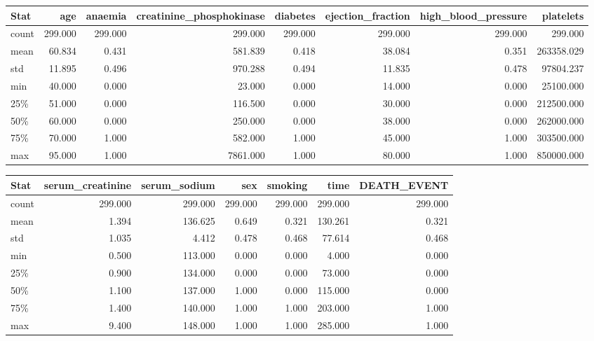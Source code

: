 \begin{table}[H]
\centering
\begin{adjustbox}{width=\textwidth}
\begin{tabular}{|l|rrrrrrr|}
\hline
\textbf{Stat} & \textbf{age} & \textbf{anaemia} & \textbf{creatinine\_phosphokinase} & \textbf{diabetes} & \textbf{ejection\_fraction} & \textbf{high\_blood\_pressure} & \textbf{platelets} \\
\hline
count & 299.000 & 299.000 & 299.000 & 299.000 & 299.000 & 299.000 & 299.000 \\
mean & 60.834 & 0.431 & 581.839 & 0.418 & 38.084 & 0.351 & 263358.029 \\
std & 11.895 & 0.496 & 970.288 & 0.494 & 11.835 & 0.478 & 97804.237 \\
min & 40.000 & 0.000 & 23.000 & 0.000 & 14.000 & 0.000 & 25100.000 \\
25\% & 51.000 & 0.000 & 116.500 & 0.000 & 30.000 & 0.000 & 212500.000 \\
50\% & 60.000 & 0.000 & 250.000 & 0.000 & 38.000 & 0.000 & 262000.000 \\
75\% & 70.000 & 1.000 & 582.000 & 1.000 & 45.000 & 1.000 & 303500.000 \\
max & 95.000 & 1.000 & 7861.000 & 1.000 & 80.000 & 1.000 & 850000.000 \\
\hline
\end{tabular}
\end{adjustbox}
\label{tab:heart_stats_part1}
\end{table}

\begin{table}[H]
\centering
\begin{adjustbox}{width=\textwidth}
\begin{tabular}{|l|rrrrrr|}
\hline
\textbf{Stat} & \textbf{serum\_creatinine} & \textbf{serum\_sodium} & \textbf{sex} & \textbf{smoking} & \textbf{time} & \textbf{DEATH\_EVENT} \\
\hline
count & 299.000 & 299.000 & 299.000 & 299.000 & 299.000 & 299.000 \\
mean & 1.394 & 136.625 & 0.649 & 0.321 & 130.261 & 0.321 \\
std & 1.035 & 4.412 & 0.478 & 0.468 & 77.614 & 0.468 \\
min & 0.500 & 113.000 & 0.000 & 0.000 & 4.000 & 0.000 \\
25\% & 0.900 & 134.000 & 0.000 & 0.000 & 73.000 & 0.000 \\
50\% & 1.100 & 137.000 & 1.000 & 0.000 & 115.000 & 0.000 \\
75\% & 1.400 & 140.000 & 1.000 & 1.000 & 203.000 & 1.000 \\
max & 9.400 & 148.000 & 1.000 & 1.000 & 285.000 & 1.000 \\
\hline
\end{tabular}
\end{adjustbox}
\label{tab:heart_stats_part2}
\end{table}



